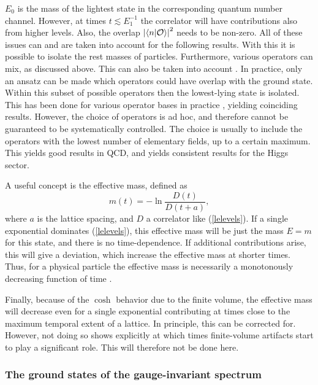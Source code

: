\documentclass[final,twoside,12pt]{article}
\newcommand*{\no}{\noindent}
\newcommand*{\be}{\begin{equation}}
\newcommand*{\ee}{\end{equation}}
\newcommand*{\pref}[1]{(\ref{#1})}
\newcommand*{\1}{1\!\!\!\bot}
\newcommand*{\la}{\left\langle}
\newcommand*{\ra}{\right\rangle}
\newcommand*{\op}{{\cal O}}
\begin{document}
$E_0$ is the mass of the lightest state in the corresponding quantum number channel. However, at times $t\lesssim E_1^{-1}$ the correlator will have contributions also from higher levels. Also, the overlap $\left|\la n|\op\ra\right|^2$ needs to be non-zero. All of these issues can \cite{Gattringer:2010zz} and are taken into account \cite{Wurtz:2013ova,Maas:2013aia,Maas:2014pba} for the following results. With this it is possible to isolate the rest masses of particles. Furthermore, various operators can mix, as discussed above. This can also be taken into account \cite{Gattringer:2010zz}. In practice, only an ansatz can be made which operators could have overlap with the ground state. Within this subset of possible operators then the lowest-lying state is isolated. This has been done for various operator bases in practice \cite{Wurtz:2013ova,Maas:2013aia,Maas:2014pba}, yielding coinciding results. However, the choice of operators is ad hoc, and therefore cannot be guaranteed to be systematically controlled. The choice is usually to include the operators with the lowest number of elementary fields, up to a certain maximum. This yields good results in QCD, and yields consistent results for the Higgs sector.

A useful concept is the effective mass, defined as \cite{Maas:2011se,Gattringer:2010zz,Montvay:1994cy}
\be
m(t)=-\ln\frac{D(t)}{D(t+a)}\label{effmass},
\ee
\no where $a$ is the lattice spacing, and $D$ a correlator like \pref{lelevels}. If a single exponential dominates \pref{lelevels}, this effective mass will be just the mass $E=m$ for this state, and there is no time-dependence. If additional contributions arise, this will give a deviation, which increase the effective mass at shorter times. Thus, for a physical particle the effective mass is necessarily a monotonously decreasing function of time \cite{Seiler:1982pw}.

Finally, because of the $\cosh$ behavior due to the finite volume, the effective mass will decrease even for a single exponential contributing at times close to the maximum temporal extent of a lattice. In principle, this can be corrected for. However, not doing so shows explicitly at which times finite-volume artifacts start to play a significant role. This will therefore not be done here. 

\subsubsection{The ground states of the gauge-invariant spectrum}\label{sss:ground}
\end{document}
